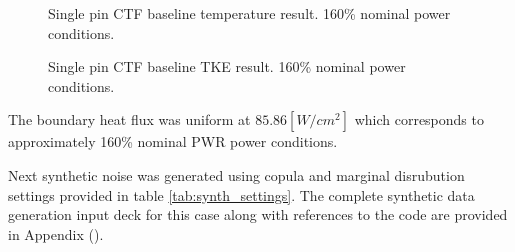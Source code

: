 \begin{figure}[H]%
    \centering
    \qquad
    \caption[Single pin CTF baseline temperature result.  160\% nominal power conditions.]{Single pin CTF baseline temperature result.  160\% nominal power conditions.}%
    \label{fig:ctf_twall_orig}%
\end{figure}

\begin{figure}[H]%
    \centering
    \qquad
    \caption[Single pin CTF baseline TKE result.  160\% nominal power conditions.]{Single pin CTF baseline TKE result.  160\% nominal power conditions.}%
    \label{fig:ctf_tke_orig}%
\end{figure}


The boundary heat flux was uniform at $85.86 [W/cm^2]$ which corresponds to approximately 160\% nominal PWR power conditions.

Next synthetic noise was generated using copula and marginal disrubution settings provided in table \ref{tab:synth_settings}. The complete synthetic data generation input deck for this case along with references to the code are provided in Appendix ().

